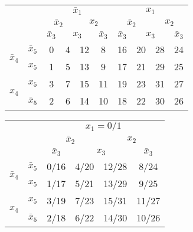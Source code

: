 \documentclass{article}
\newcommand{\bx}{\bar{x}}
\begin{document}
\begin{table*}
  \begin{tabular}{c|c|c|c|c|c|c|c|c|c}
  \toprule
  && \multicolumn{4}{c|}{$\bx_1$} & \multicolumn{4}{c}{$x_1$}
    \\
    && \multicolumn{2}{c|}{$\bx_2$} & \multicolumn{2}{c|}{$x_2$}
               & \multicolumn{2}{c|}{$\bx_2$} & \multicolumn{2}{c}{$x_2$}
  \\
  && $\bx_3$ & \multicolumn{2}{c|}{$x_3$} & $\bx_3$
              & $\bx_3$ & \multicolumn{2}{c|}{$x_3$} & $\bx_3$
  \\ \midrule
  \multirow{2}{*}{$\bx_4$} & $\bx_5$
                                  & 0 & 4 & 12 & 8
                                              & 16 & 20 &  28 & 24
  \\
  & $x_5$
                                  & 1 & 5 & 13 & 9
                                              & 17 & 21 &  29 & 25
  \\
  \multirow{2}{*}{$x_4$}   &  $x_5$
                                  & 3 & 7 & 15 & 11
                                              & 19 & 23 &  31 & 27
  \\
  & $\bx_5$
                                  & 2 & 6 & 14 & 10
                                              & 18 & 22 &  30 & 26
  \\\bottomrule
\end{tabular}

\hfill

\begin{tabular}{c|c|cccc}
  \toprule
  && \multicolumn{4}{c}{$x_1 = 0/1$}
  \\
  && \multicolumn{2}{c|}{$\bx_2$} & \multicolumn{2}{c}{$x_2$}
                                    
  \\
  && $\bx_3$ & \multicolumn{2}{|c|}{$x_3$} & $\bx_3$
  \\ \midrule
  \multirow{2}{*}{$\bx_4$} & $\bx_5$
  &
    0/16 & 4/20 &  12/28 & 8/24
  \\
  & $x_5$
  &
    1/17 & 5/21  & 13/29 & 9/25
  \\
  \multirow{2}{*}{$x_4$}   &  $x_5$
  &
    3/19 & 7/23 &  15/31 & 11/27
  \\
  & $\bx_5$
  &
    2/18 & 6/22 & 14/30 & 10/26
  \\\bottomrule
\end{tabular}
\caption{K-map for 5-variables with numbered minterms}
\end{table*}
\end{document}
